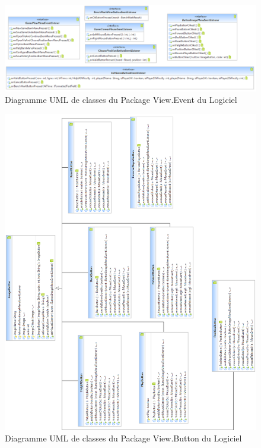 \documentclass[a4paper,12pt]{report}
\begin{document}
\label{OthKerViewEvent}
\begin{figure}[H]
\centering
 \includegraphics[scale=0.5]{Kernel/Pack_com_view_event.png}
\caption{Diagramme UML de classes du Package View.Event du Logiciel}
\end{figure}

\label{OthKerViewButton}
\begin{figure}[H]
\centering
  \includegraphics[scale=0.51]{Kernel/Pack_com_view_button.png}
\caption{Diagramme UML de classes du Package View.Button du Logiciel}
\end{figure}
\end{document}
